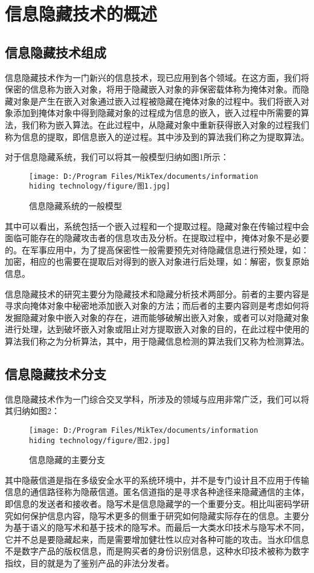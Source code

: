 	\section{信息隐藏技术的概述}
    \subsection{信息隐藏技术组成} 
    信息隐藏技术作为一门新兴的信息技术\cite{ref1}，现已应用到各个领域。在这方面，我们将保密的信息称为嵌入对象，将用于隐藏嵌入对象的非保密载体称为掩体对象。而隐藏对象是产生在嵌入对象通过嵌入过程被隐藏在掩体对象的过程中。我们将嵌入对象添加到掩体对象中得到隐藏对象的过程成为信息的嵌入，嵌入过程中所需要的算法，我们称为嵌入算法。在此过程中，从隐藏对象中重新获得嵌入对象的过程我们称为信息的提取，即信息嵌入的逆过程。其中涉及到的算法我们称之为提取算法。
    \par 对于信息隐藏系统，我们可以将其一般模型归纳如图1所示：
    \begin{figure}[!ht]\centering   %
    \texttt{[image: D:/Program Files/MikTex/documents/information hiding technology/figure/图1.jpg]}%
    \caption{信息隐藏系统的一般模型}
    \end{figure}
    \par\noindent 其中可以看出，系统包括一个嵌入过程和一个提取过程。隐藏对象在传输过程中会面临可能存在的隐藏攻击者的信息攻击及分析。在提取过程中，掩体对象不是必要的。在军事应用中，为了提高保密性一般需要预先对待隐藏信息进行预处理，如：加密，相应的也需要在提取后对得到的嵌入对象进行后处理，如：解密，恢复原始信息。
    \par 信息隐藏技术的研究主要分为隐藏技术和隐藏分析技术两部分\cite{ref2}。前者的主要内容是寻求向掩体对象中秘密地添加嵌入对象的方法；而后者的主要内容则是考虑如何将发掘隐藏对象中嵌入对象的存在，进而能够破解出嵌入对象，或者可以对隐藏对象进行处理，达到破坏嵌入对象或阻止对方提取嵌入对象的目的，在此过程中使用的算法我们称之为分析算法，其中，用于隐藏信息检测的算法我们又称为检测算法\cite{ref3}。
    \subsection{信息隐藏技术分支} 
    信息隐藏技术作为一门综合交叉学科，所涉及的领域与应用非常广泛，我们可以将其归纳如图2：
    \begin{figure}[!ht]\centering   %
    \texttt{[image: D:/Program Files/MikTex/documents/information hiding technology/figure/图2.jpg]}%
    \caption{信息隐藏的主要分支}
    \end{figure}
    \par\noindent 其中隐蔽信道是指在多级安全水平的系统环境中，并不是专门设计且不应用于传输信息的通信路径称为隐蔽信道。匿名信道指的是寻求各种途径来隐藏通信的主体，即信息的发送者和接收者。隐写术是信息隐藏学的一个重要分支。相比叫密码学研究如何保护信息内容，隐写术更多的侧重于研究如何隐藏实际存在的信息。主要分为基于语义的隐写术和基于技术的隐写术。而最后一大类水印技术与隐写术不同，它并不总是要隐藏起来，而是需要增加健壮性以应对各种可能的攻击。当水印信息不是数字产品的版权信息，而是购买者的身份识别信息，这种水印技术被称为数字指纹，目的就是为了鉴别产品的非法分发者。

